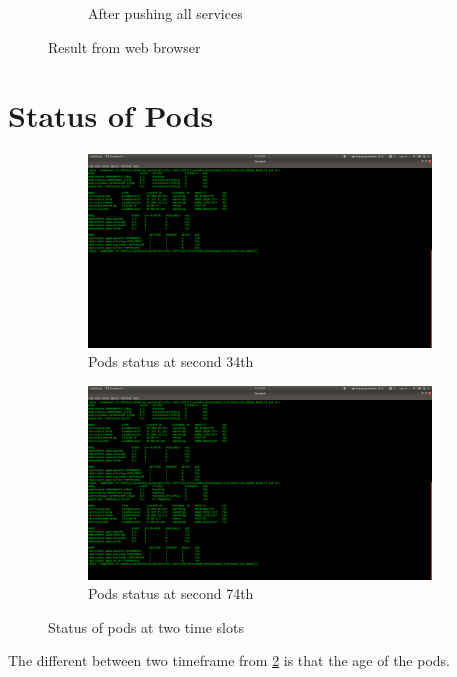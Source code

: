 \documentclass[11pt,a4paper]{article}
\begin{document}
\begin{figure}[p]
\begin{subfigure}[b]{\linewidth}
    		\caption{After pushing all services}
  		\end{subfigure}
  		\caption{Result from web browser}
  		\label{fig:dockerhubrepo}
	\end{figure}

	\newpage
	\section{Status of Pods}
	\label{sec:stpod}
  	\begin{figure}[h!]
		\centering
  		\begin{subfigure}[b]{0.4\linewidth}
  		\includegraphics[width=\linewidth]{status-at34.png}
    		\caption{Pods status at second 34th}
  		\end{subfigure}
  		\begin{subfigure}[b]{0.4\linewidth}
    		\includegraphics[width=\linewidth]{status-at74.png}
    		\caption{Pods status at second 74th}
  		\end{subfigure}
  		\caption{Status of pods at two time slots}
  		\label{fig:podstat}
	\end{figure}
	The different between two timeframe from \ref{fig:podstat} is that the age of the pods.
\end{document}
